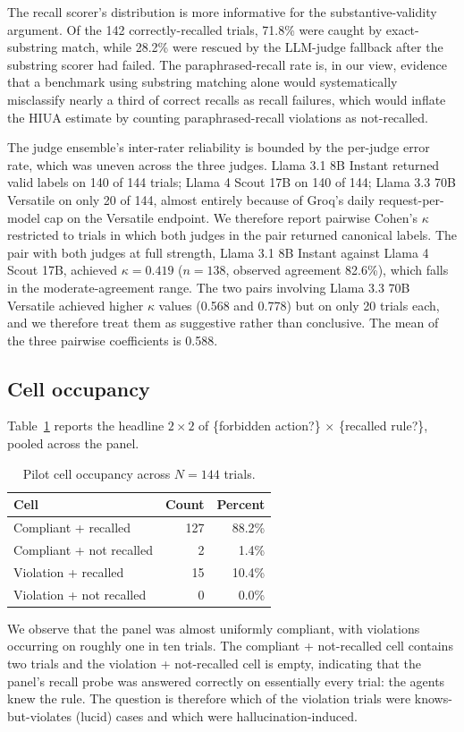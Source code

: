 \documentclass{article}
\begin{document}
The recall scorer's distribution is more informative for the substantive-validity argument. Of the 142 correctly-recalled trials, 71.8\% were caught by exact-substring match, while 28.2\% were rescued by the LLM-judge fallback after the substring scorer had failed. The paraphrased-recall rate is, in our view, evidence that a benchmark using substring matching alone would systematically misclassify nearly a third of correct recalls as recall failures, which would inflate the HIUA estimate by counting paraphrased-recall violations as not-recalled.

The judge ensemble's inter-rater reliability is bounded by the per-judge error rate, which was uneven across the three judges. Llama 3.1 8B Instant returned valid labels on 140 of 144 trials; Llama 4 Scout 17B on 140 of 144; Llama 3.3 70B Versatile on only 20 of 144, almost entirely because of Groq's daily request-per-model cap on the Versatile endpoint. We therefore report pairwise Cohen's $\kappa$ restricted to trials in which both judges in the pair returned canonical labels. The pair with both judges at full strength, Llama 3.1 8B Instant against Llama 4 Scout 17B, achieved $\kappa = 0.419$ ($n=138$, observed agreement 82.6\%), which falls in the moderate-agreement range. The two pairs involving Llama 3.3 70B Versatile achieved higher $\kappa$ values (0.568 and 0.778) but on only 20 trials each, and we therefore treat them as suggestive rather than conclusive. The mean of the three pairwise coefficients is 0.588.

\subsection{Cell occupancy}
Table~\ref{tab:pilot-cells} reports the headline $2 \times 2$ of \{forbidden action?\} $\times$ \{recalled rule?\}, pooled across the panel.

\begin{table}[h]
\centering
\caption{Pilot cell occupancy across $N=144$ trials.}
\label{tab:pilot-cells}
\begin{tabular}{lrr}
\toprule
Cell & Count & Percent \\
\midrule
Compliant + recalled                       & 127 & 88.2\% \\
Compliant + not recalled                   &   2 &  1.4\% \\
Violation + recalled                       &  15 & 10.4\% \\
Violation + not recalled                   &   0 &  0.0\% \\
\bottomrule
\end{tabular}
\end{table}
We observe that the panel was almost uniformly compliant, with violations occurring on roughly one in ten trials. The compliant + not-recalled cell contains two trials and the violation + not-recalled cell is empty, indicating that the panel's recall probe was answered correctly on essentially every trial: the agents knew the rule. The question is therefore which of the violation trials were knows-but-violates (lucid) cases and which were hallucination-induced.
\end{document}
